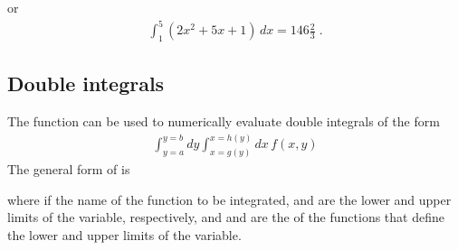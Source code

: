 \documentclass[letterpaper,10pt,english]{sphinxmanual}
\begin{document}
\begin{sphinxVerbatim}[commandchars=\\\{\}]

\end{sphinxVerbatim}

\sphinxAtStartPar
or
\begin{equation*}
\begin{split}\int_1^5 \left(2x^2 + 5x +1\right)\, dx = 146\tfrac{2}{3} \;.\end{split}
\end{equation*}
\ignorespaces 

\subsection{Double integrals}
\label{\detokenize{chap9/chap9_scipy:double-integrals}}\label{\detokenize{chap9/chap9_scipy:index-3}}
\sphinxAtStartPar
The  function  can be used to numerically evaluate double integrals of the form
\begin{equation*}
\begin{split}\int_{y=a}^{y=b} dy \int_{x=g(y)}^{x=h(y)} dx\,f(x,y)\end{split}
\end{equation*}
\sphinxAtStartPar
The general form of  is

\begin{sphinxVerbatim}[commandchars=\\\{\}]
\end{sphinxVerbatim}

\sphinxAtStartPar
where  if the name of the function to be integrated,  and  are the lower and upper limits of the  variable, respectively, and  and  are the  of the functions that define the lower and upper limits of the  variable.
\end{document}
